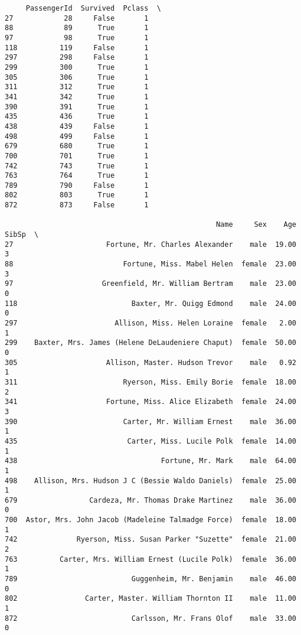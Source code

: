 \documentclass[11pt]{article}
\begin{document}
    \begin{verbatim}
     PassengerId  Survived  Pclass  \
27            28     False       1   
88            89      True       1   
97            98      True       1   
118          119     False       1   
297          298     False       1   
299          300      True       1   
305          306      True       1   
311          312      True       1   
341          342      True       1   
390          391      True       1   
435          436      True       1   
438          439     False       1   
498          499     False       1   
679          680      True       1   
700          701      True       1   
742          743      True       1   
763          764      True       1   
789          790     False       1   
802          803      True       1   
872          873     False       1   

                                                  Name     Sex    Age  SibSp  \
27                      Fortune, Mr. Charles Alexander    male  19.00      3   
88                          Fortune, Miss. Mabel Helen  female  23.00      3   
97                     Greenfield, Mr. William Bertram    male  23.00      0   
118                           Baxter, Mr. Quigg Edmond    male  24.00      0   
297                       Allison, Miss. Helen Loraine  female   2.00      1   
299    Baxter, Mrs. James (Helene DeLaudeniere Chaput)  female  50.00      0   
305                     Allison, Master. Hudson Trevor    male   0.92      1   
311                         Ryerson, Miss. Emily Borie  female  18.00      2   
341                     Fortune, Miss. Alice Elizabeth  female  24.00      3   
390                         Carter, Mr. William Ernest    male  36.00      1   
435                          Carter, Miss. Lucile Polk  female  14.00      1   
438                                  Fortune, Mr. Mark    male  64.00      1   
498    Allison, Mrs. Hudson J C (Bessie Waldo Daniels)  female  25.00      1   
679                 Cardeza, Mr. Thomas Drake Martinez    male  36.00      0   
700  Astor, Mrs. John Jacob (Madeleine Talmadge Force)  female  18.00      1   
742              Ryerson, Miss. Susan Parker "Suzette"  female  21.00      2   
763          Carter, Mrs. William Ernest (Lucile Polk)  female  36.00      1   
789                           Guggenheim, Mr. Benjamin    male  46.00      0   
802                Carter, Master. William Thornton II    male  11.00      1   
872                           Carlsson, Mr. Frans Olof    male  33.00      0   


\end{verbatim}
\end{document}
